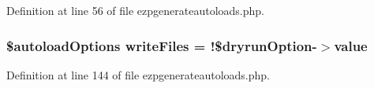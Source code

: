 \-Definition at line 56 of file ezpgenerateautoloads.\-php.

\hypertarget{ezpgenerateautoloads_8php_a210f8683b204a76199152312e3d9a177}{
\subsubsection[{write\-Files}]{\setlength{\rightskip}{0pt plus 5cm}\$autoload\-Options {\bf write\-Files} = !\$dryrun\-Option-\/$>$value}}\label{ezpgenerateautoloads_8php_a210f8683b204a76199152312e3d9a177}


\-Definition at line 144 of file ezpgenerateautoloads.\-php.

